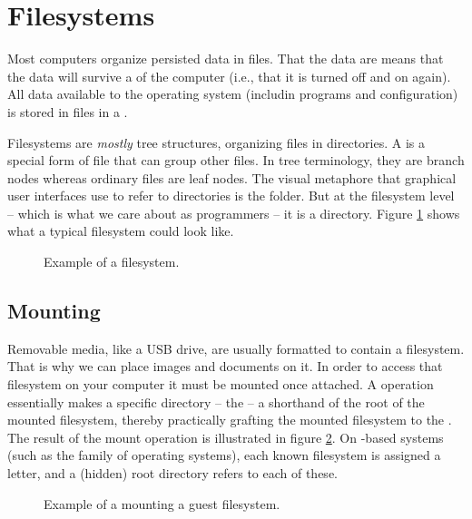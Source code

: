 \section{Filesystems}
\label{bg:fs}

Most computers organize persisted data in files. That the data are  means that the data will survive a  of the computer (i.e., that it is turned off and on again). All data available to the operating system (includin programs and configuration) is stored in files in a .

Filesystems are \textsl{mostly} tree structures, organizing files in directories. A  is a special form of file that can group other files. In tree terminology, they are branch nodes whereas ordinary files are leaf nodes. The visual metaphore that graphical user interfaces use to refer to directories is the folder. But at the filesystem level -- which is what we care about as programmers -- it is a directory. Figure \ref{fig:bs:fs} shows what a typical filesystem could look like.

\begin{figure}[tbp]
  
  \caption{Example of a filesystem.}
  \label{fig:bs:fs}
\end{figure}

\subsection{Mounting}

Removable media, like a USB drive, are usually formatted to contain a filesystem. That is why we can place images and documents on it. In order to access that filesystem on your computer it must be mounted once attached. A  operation essentially makes a specific directory -- the  -- a shorthand of the root of the mounted filesystem, thereby practically grafting the mounted filesystem to the . The result of the mount operation is illustrated in figure \ref{fig:bs:fs:mounting}. On -based systems (such as the  family of operating systems),
each known filesystem is assigned a letter, and a (hidden) root directory refers
to each of these.

\begin{figure}[tbp]
  
  \caption{Example of a mounting a guest filesystem.}
  \label{fig:bs:fs:mounting}
\end{figure}

